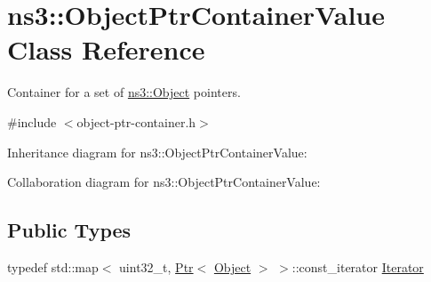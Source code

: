 \hypertarget{classns3_1_1ObjectPtrContainerValue}{}\section{ns3\+:\+:Object\+Ptr\+Container\+Value Class Reference}
\label{classns3_1_1ObjectPtrContainerValue}


Container for a set of \hyperlink{classns3_1_1Object}{ns3\+::\+Object} pointers.  




{\ttfamily \#include $<$object-\/ptr-\/container.\+h$>$}



Inheritance diagram for ns3\+:\+:Object\+Ptr\+Container\+Value\+:


Collaboration diagram for ns3\+:\+:Object\+Ptr\+Container\+Value\+:
\subsection*{Public Types}
\begin{DoxyCompactItemize}
\item 
typedef std\+::map$<$ uint32\+\_\+t, \hyperlink{classns3_1_1Ptr}{Ptr}$<$ \hyperlink{classns3_1_1Object}{Object} $>$ $>$\+::const\+\_\+iterator \hyperlink{classns3_1_1ObjectPtrContainerValue_a1f0661f9cf3626d62a4623f36b672876}{Iterator}
\end{DoxyCompactItemize}
